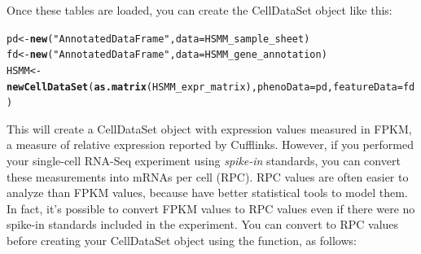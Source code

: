 \documentclass[10pt,oneside]{article}\usepackage[]{graphicx}\usepackage[]{color}
\makeatletter
\newcommand{\hlstr}[1]{\textcolor[rgb]{0.192,0.494,0.8}{#1}}%
\newcommand{\hlstd}[1]{\textcolor[rgb]{0.345,0.345,0.345}{#1}}%
\newcommand{\hlkwb}[1]{\textcolor[rgb]{0.69,0.353,0.396}{#1}}%
\newcommand{\hlkwc}[1]{\textcolor[rgb]{0.333,0.667,0.333}{#1}}%
\newcommand{\hlkwd}[1]{\textcolor[rgb]{0.737,0.353,0.396}{\textbf{#1}}}%
\newenvironment{kframe}{%
 \def\at@end@of@kframe{}%
 \ifinner\ifhmode%
  \def\at@end@of@kframe{\end{minipage}}%
  \begin{minipage}{\columnwidth}%
 \fi\fi%
 \def\FrameCommand##1{\hskip\@totalleftmargin \hskip-\fboxsep
 \colorbox{shadecolor}{##1}\hskip-\fboxsep
     \hskip-\linewidth \hskip-\@totalleftmargin \hskip\columnwidth}%
 \MakeFramed {\advance\hsize-\width
   \@totalleftmargin\z@ \linewidth\hsize
   \@setminipage}}%
 {\par\unskip\endMakeFramed%
 \at@end@of@kframe}
\newenvironment{knitrout}{}{} %
\makeatother
\begin{document}
Once these tables are loaded, you can create the CellDataSet object like this:

\begin{knitrout}
\color{fgcolor}\begin{kframe}
\begin{alltt}
\hlstd{pd} \hlkwb{<-} \hlkwd{new}\hlstd{(}\hlstr{"AnnotatedDataFrame"}\hlstd{,} \hlkwc{data} \hlstd{= HSMM_sample_sheet)}
\hlstd{fd} \hlkwb{<-} \hlkwd{new}\hlstd{(}\hlstr{"AnnotatedDataFrame"}\hlstd{,} \hlkwc{data} \hlstd{= HSMM_gene_annotation)}
\hlstd{HSMM} \hlkwb{<-} \hlkwd{newCellDataSet}\hlstd{(}\hlkwd{as.matrix}\hlstd{(HSMM_expr_matrix),} \hlkwc{phenoData} \hlstd{= pd,} \hlkwc{featureData} \hlstd{= fd)}
\end{alltt}
\end{kframe}
\end{knitrout}

This will create a CellDataSet object with expression values measured in FPKM, a measure of relative expression reported by Cufflinks. However, if you performed your single-cell RNA-Seq experiment using \emph{spike-in} standards, you can convert these measurements into mRNAs per cell (RPC). RPC values are often easier to analyze than FPKM values, because have better statistical tools to model them. In fact, it's possible to convert FPKM values to RPC values even if there were no spike-in standards included in the experiment. You can convert to RPC values before creating your CellDataSet object using the  function, as follows:
\end{document}
